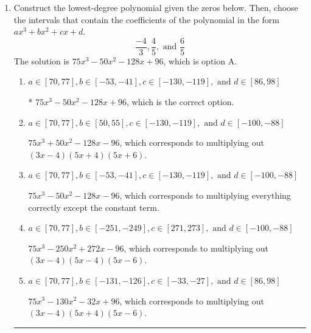 \documentclass{extbook}[14pt]
\newcommand{\litem}[1]{\item #1

\rule{\textwidth}{0.4pt}}
\begin{document}
\begin{enumerate}\litem{
Construct the lowest-degree polynomial given the zeros below. Then, choose the intervals that contain the coefficients of the polynomial in the form $ax^3+bx^2+cx+d$.
\[ \frac{-4}{3}, \frac{4}{5}, \text{ and } \frac{6}{5} \]The solution is \( 75x^{3} -50 x^{2} -128 x + 96 \), which is option A.\begin{enumerate}[label=\Alph*.]
\item \( a \in [70, 77], b \in [-53, -41], c \in [-130, -119], \text{ and } d \in [86, 98] \)

* $75x^{3} -50 x^{2} -128 x + 96$, which is the correct option.
\item \( a \in [70, 77], b \in [50, 55], c \in [-130, -119], \text{ and } d \in [-100, -88] \)

$75x^{3} +50 x^{2} -128 x -96$, which corresponds to multiplying out $(3x -4)(5x + 4)(5x + 6)$.
\item \( a \in [70, 77], b \in [-53, -41], c \in [-130, -119], \text{ and } d \in [-100, -88] \)

$75x^{3} -50 x^{2} -128 x -96$, which corresponds to multiplying everything correctly except the constant term.
\item \( a \in [70, 77], b \in [-251, -249], c \in [271, 273], \text{ and } d \in [-100, -88] \)

$75x^{3} -250 x^{2} +272 x -96$, which corresponds to multiplying out $(3x -4)(5x -4)(5x -6)$.
\item \( a \in [70, 77], b \in [-131, -126], c \in [-33, -27], \text{ and } d \in [86, 98] \)

$75x^{3} -130 x^{2} -32 x + 96$, which corresponds to multiplying out $(3x -4)(5x + 4)(5x -6)$.
\end{enumerate}

}
\end{enumerate}
\end{document}
